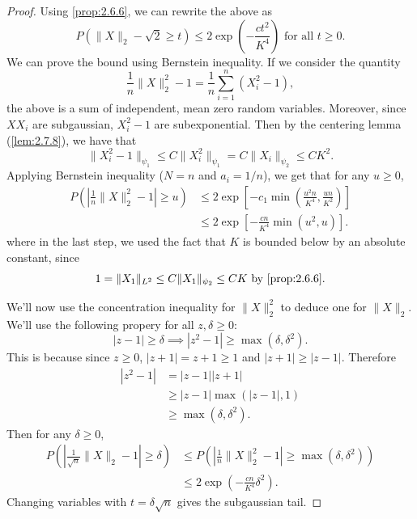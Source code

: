 \begin{proof}
Using \cref{prop:2.6.6}, we can rewrite the above as 
\[ P(\lVert X \rVert_2 - \sqrt{2} \geq t) \leq 2\exp{\left( -\frac{ct^2}{K^4} \right)} \text{ for all } 
t \geq 0. \]
We can prove the bound using Bernstein inequality. If we consider the quantity 
\[ \frac{1}{n}\lVert X \rVert_{2}^2 - 1 = \frac{1}{n}\sum_{i = 1}^{n} (X_i^2 - 1), \]
the above is a sum of independent, mean zero random variables. Moreover, since $XX_i$ are subgaussian, 
$X_i^2 - 1$ are subexponential. Then by the centering lemma (\cref{lem:2.7.8}), we have that 
\[ \lVert X_i^2 - 1 \rVert_{\psi_1} \leq C \lVert X_i^2 \rVert_{\psi_1} 
= C \lVert X_i \rVert_{\psi_2} \leq CK^2. \]
Applying Bernstein inequality ($N = n$ and $a_i = 1/n$), we get that for any $u \geq 0$, 
\begin{align*}
	P \left( \left| \frac{1}{n}\lVert X \rVert_{2}^2 - 1 \right| \geq u \right) 
	&\leq 2\exp{\left[ -c_1 \min_{} \left( \frac{u^2 n}{K^4}, \frac{un}{K^2} \right) \right]} \\
	&\leq 2 \exp{\left[ -\frac{cn}{K^4} \min_{}(u^2, u) \right]}.
\end{align*}
where in the last step, we used the fact that $K$ is bounded below by an absolute constant, since 
\[ 1 = \lVert X_1 \rVert_{L^2} \leq C \lVert X_1 \rVert_{\psi_2} \leq CK \text{ by \cref{prop:2.6.6}}. \]

We'll now use the concentration inequality for $\lVert X \rVert_{2}^2$ to deduce one for 
$\lVert X \rVert_{2}$. We'll use the following propery for all $z, \delta \geq 0$: 
\[ |z - 1| \geq \delta \implies |z^2 - 1| \geq \max_{}(\delta, \delta^2). \]
This is because since $z \geq 0$, $|z + 1| = z + 1 \geq 1$ and $|z + 1| \geq |z - 1|$. Therefore 
\begin{align*}
	|z^2 - 1| 
	&= |z - 1||z + 1| \\
	&\geq |z - 1| \max_{}(|z - 1|, 1) \\
	&\geq \max_{}(\delta, \delta^2).
\end{align*}
Then for any $\delta \geq 0$, 
\begin{align*}
	P \left( \left| \frac{1}{\sqrt{n}} \lVert X \rVert_{2} - 1 \right|  \geq \delta \right) 
	&\leq P \left( \left| \frac{1}{n} \lVert X \rVert_{2}^2 - 1 \right| \geq \max_{}(\delta, \delta^2) \right) \\
	&\leq 2\exp{\left( -\frac{cn}{K^4} \delta^2 \right)}.
\end{align*}
Changing variables with $t = \delta \sqrt{n}$ gives the subgaussian tail.
\end{proof}

